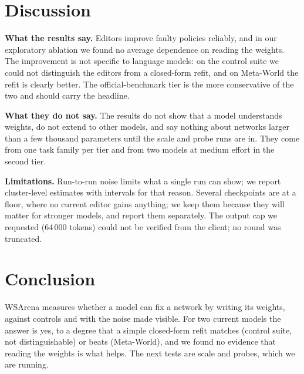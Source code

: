 \documentclass[conference]{IEEEtran}
\begin{document}
\section{Discussion}
\textbf{What the results say.} Editors improve faulty policies reliably, and in our exploratory ablation we found no average dependence on reading the weights. The improvement is not specific to language models: on the control suite we could not distinguish the editors from a closed-form refit, and on Meta-World the refit is clearly better. The official-benchmark tier is the more conservative of the two and should carry the headline.

\textbf{What they do not say.} The results do not show that a model understands weights, do not extend to other models, and say nothing about networks larger than a few thousand parameters until the scale and probe runs are in. They come from one task family per tier and from two models at medium effort in the second tier.

\textbf{Limitations.} Run-to-run noise limits what a single run can show; we report cluster-level estimates with intervals for that reason. Several checkpoints are at a floor, where no current editor gains anything; we keep them because they will matter for stronger models, and report them separately. The output cap we requested (64\,000 tokens) could not be verified from the client; no round was truncated.

\section{Conclusion}
WSArena measures whether a model can fix a network by writing its weights, against controls and with the noise made visible. For two current models the answer is yes, to a degree that a simple closed-form refit matches (control suite, not distinguishable) or beats (Meta-World), and we found no evidence that reading the weights is what helps. The next tests are scale and probes, which we are running.



\end{document}
